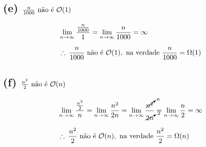 \subsection*{(e) $\frac{n}{1000} \text{ não é } \mathcal{O}(1)$}

\begin{equation*}
  \setlength{\jot}{10pt}
  \begin{aligned}
    &\lim_{n \to\infty} \frac{\frac{n}{1000}}{1} = \lim_{n \to\infty} \frac{n}{1000} = \infty \\
    &\therefore\: \frac{n}{1000} \text{ não é } \bigO(1), \text{ na verdade } \frac{n}{1000} = \Omega(1)
\end{aligned}\end{equation*}


\subsection*{(f) $\frac{n^2}{2} \text{ não é } \mathcal{O}(n)$}

\begin{equation*}
  \setlength{\jot}{10pt}
  \begin{aligned}
    &\lim_{n \to\infty} \frac{\frac{n^2}{2}}{n} = \lim_{n \to\infty} \frac{n^2}{2n} = \lim_{n \to\infty} \frac{\cancelto{n}{n^2}}{\cancelto{2}{2n}}  = \lim_{n \to\infty} \frac{n}{2} = \infty \\
    &\therefore\: \frac{n^2}{2} \text{ não é } \bigO(n), \text{ na verdade } \frac{n^2}{2} = \Omega(n)
\end{aligned}\end{equation*}

